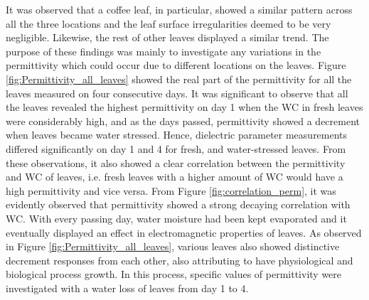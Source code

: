 \documentclass[journal,article,submit,moreauthors,pdftex]{Definitions/mdpi}
\renewcommand{\^}{\hat}  %
\begin{document}
It was observed that a coffee leaf, in particular, showed a similar pattern across all the three locations and the leaf surface irregularities deemed to be very negligible. Likewise, the rest of other leaves displayed a similar trend. The purpose of these findings was mainly to investigate any variations in the permittivity which could occur due to different locations on the leaves.
Figure \ref{fig:Permittivity_all_leaves} showed the real part of the permittivity for all the leaves measured on four consecutive days. It was significant to observe that all the leaves revealed the highest permittivity on day 1 when the WC in fresh leaves were considerably high, and as the days passed, permittivity showed a decrement when leaves became water stressed. Hence, dielectric parameter measurements differed significantly on day 1 and 4 for fresh, and water-stressed leaves. From these observations, it also showed a clear correlation between the permittivity and WC of leaves, i.e. fresh leaves with a higher amount of WC would have a high permittivity and vice versa. From Figure \ref{fig:correlation_perm}, it was evidently observed that permittivity showed a strong decaying correlation with WC. With every passing day, water moisture had been kept evaporated and it eventually displayed an effect in electromagnetic properties of leaves. As observed in Figure \ref{fig:Permittivity_all_leaves}, various leaves also showed distinctive decrement responses from each other, also attributing to have physiological and biological process growth. In this process, specific values of permittivity were investigated with a water loss of leaves from day 1 to 4.\\
\end{document}
